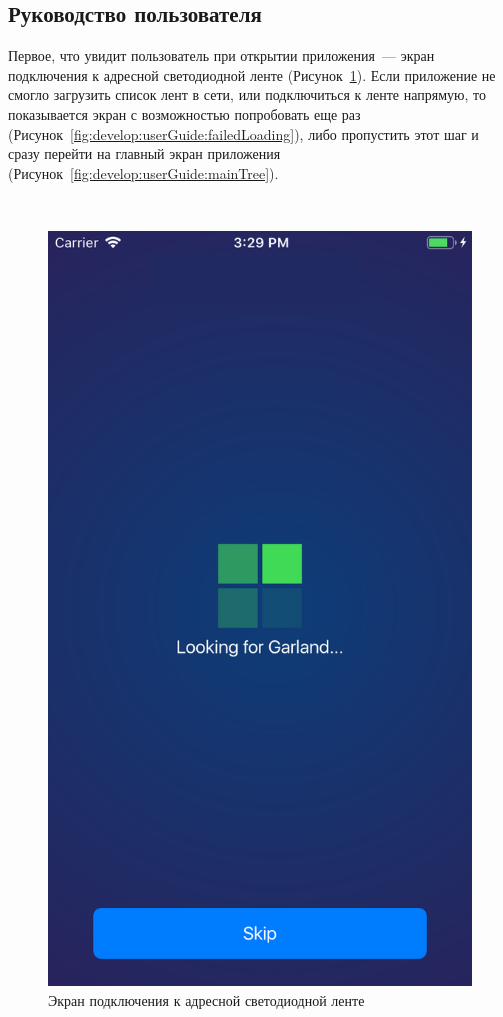 \subsection{Руководство пользователя}
\label{sec:develop:userGuide}

Первое, что увидит пользователь при открытии приложения~--- экран подключения к адресной светодиодной ленте (Рисунок~\ref{fig:develop:userGuide:loading}). Если приложение не смогло загрузить список лент в сети, или подключиться к ленте напрямую, то показывается экран с возможностью попробовать еще раз (Рисунок~\ref{fig:develop:userGuide:failedLoading}), либо пропустить этот шаг и сразу перейти на главный экран приложения (Рисунок~\ref{fig:develop:userGuide:mainTree}).

~
\begin{figure}[H]
\centering
	\includegraphics[scale=0.2]{figures/userGuide/loading.png}
	\caption{Экран подключения к адресной светодиодной ленте}
	\label{fig:develop:userGuide:loading}
\end{figure}

